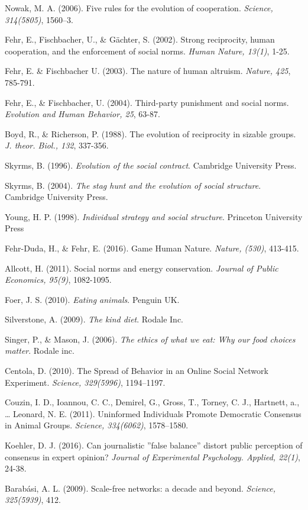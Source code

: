 \documentclass[rutwik_proposal.tex]{subfiles}
\begin{document}
\begin{thebibliography}{100}
Nowak, M. A. 
(2006). 
Five rules for the evolution of cooperation. 
\emph{Science, 314(5805)}, 
1560–3.

Fehr, E., Fischbacher, U., \& G\"achter, S.
(2002).
Strong reciprocity, human cooperation, and the enforcement of social norms.
\emph{Human Nature, 13(1)},
1-25.

Fehr, E. \& Fischbacher U.
(2003).
The nature of human altruism.
\emph{Nature, 425},
785-791.

Fehr, E., \& Fischbacher, U.
(2004).
Third-party punishment and social norms.
\emph{Evolution and Human Behavior, 25},
63-87.

Boyd, R., \& Richerson, P.
(1988).
The evolution of reciprocity in sizable groups.
\emph{J. theor. Biol., 132},
337-356.

Skyrms, B.
(1996).
\emph{Evolution of the social contract}.
Cambridge University Press.

Skyrms, B.
(2004).
\emph{The stag hunt and the evolution of social structure}.
Cambridge University Press.

Young, H. P.
(1998).
\emph{Individual strategy and social structure}.
Princeton University Press

Fehr-Duda, H., \& Fehr, E. 
(2016). 
Game Human Nature.
\emph{Nature, (530)},
413-415.

Allcott, H. 
(2011). 
Social norms and energy conservation. 
\emph{Journal of Public Economics, 95(9)}, 
1082-1095.

Foer, J. S. 
(2010). 
\emph{Eating animals}. 
Penguin UK.

Silverstone, A.
(2009).
\emph{The kind diet}.
Rodale Inc.

Singer, P., \& Mason, J.
(2006).
\emph{The ethics of what we eat: Why our food choices matter}.
Rodale inc.

Centola, D. 
(2010). 
The Spread of Behavior in an Online Social Network Experiment. 
\emph{Science, 329(5996)}, 
1194–1197.

Couzin, I. D., Ioannou, C. C., Demirel, G., Gross, T., Torney, C. J., Hartnett, a., … Leonard, N. E. 
(2011). 
Uninformed Individuals Promote Democratic Consensus in Animal Groups. 
\emph{Science, 334(6062)}, 
1578–1580.

Koehler, D. J.
(2016).
Can journalistic ''false balance'' distort public perception of consensus in expert opinion?
\emph{Journal of Experimental Psychology. Applied, 22(1)},
24-38.

Barabási, A. L. 
(2009). 
Scale-free networks: a decade and beyond. 
\emph{Science, 325(5939)}, 
412.

\end{thebibliography}
\end{document}
